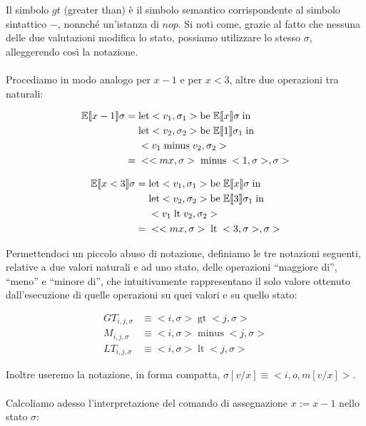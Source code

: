     Il simbolo $gt$ (greater than) è il simbolo semantico corrispondente al simbolo sintattico $-$, nonnché un'istanza di $nop$. Si noti come, grazie al fatto che nessuna delle due valutazioni modifica lo stato, possiamo utilizzare lo stesso $\sigma$, alleggerendo così la notazione.\\
    \\
    Procediamo in modo analogo per $x-1$ e per $x<3$, altre due operazioni tra naturali:
    
    \begin{align*}
        \mathbb{E}\llbracket x-1 \rrbracket\sigma =\;& \mbox{let} <v_1,\sigma_1> \mbox{be}\; \mathbb{E}\llbracket x \rrbracket\sigma\; \mbox{in}\;\\
        &\mbox{let} <v_2,\sigma_2> \mbox{be}\; \mathbb{E}\llbracket 1 \rrbracket\sigma_1\; \mbox{in}\;\\
        &<v_1\; \mbox{minus}\; v_2, \sigma_2>\\
        =\;& <<mx,\sigma>\; \mbox{minus}\; <1, \sigma>, \sigma>
    \end{align*}
    
    \begin{align*}
        \mathbb{E}\llbracket x<3 \rrbracket\sigma =\;& \mbox{let} <v_1,\sigma_1> \mbox{be}\; \mathbb{E}\llbracket x \rrbracket\sigma\; \mbox{in}\;\\
        &\mbox{let} <v_2,\sigma_2> \mbox{be}\; \mathbb{E}\llbracket 3 \rrbracket\sigma_1\; \mbox{in}\;\\
        &<v_1\; \mbox{lt}\; v_2, \sigma_2>\\
        =\;& <<mx,\sigma>\; \mbox{lt}\; <3, \sigma>, \sigma>
    \end{align*}
    
    Permettendoci un piccolo abuso di notazione, definiamo le tre notazioni seguenti, relative a due valori naturali e ad uno stato, delle operazioni ``maggiore di'', ``meno'' e ``minore di'', che intuitivamente rappresentano il solo valore ottenuto dall'esecuzione di quelle operazioni su quei valori e su quello stato:
    
    \begin{align*}
        GT_{i,j,\sigma} &\equiv <i,\sigma>\; \mbox{gt}\; <j, \sigma>\\
        M_{i,j,\sigma} &\equiv <i,\sigma>\; \mbox{minus}\; <j, \sigma>\\
        LT_{i,j,\sigma} &\equiv <i,\sigma>\; \mbox{lt}\; <j, \sigma>
    \end{align*}
    
    Inoltre useremo la notazione, in forma compatta, $\sigma[v/x] \equiv <i,o,m[v/x]>$.\\
    \\
    Calcoliamo adesso l'interpretazione del comando di assegnazione $x:=x-1$ nello stato $\sigma$:
    
